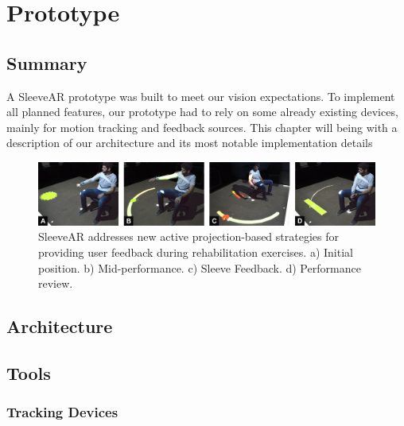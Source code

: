 \chapter{Prototype}
\label{sec:implementation}

\section*{Summary}
A SleeveAR prototype was built to meet our vision expectations. To implement all planned features, our prototype had to rely on some already existing devices, mainly for motion tracking and feedback sources. This chapter will being with a description of our architecture and its most notable implementation details




\begin{figure}[!t]
    \begin{center}
        \includegraphics[width=\textwidth]{imgs/impl/teaser.jpg}
    \end{center}
    \caption{SleeveAR addresses new active projection-based strategies for providing user feedback during rehabilitation exercises. a) Initial position. b) Mid-performance. c) Sleeve Feedback. d) Performance review.}
    \label{fig:teaser}
\end{figure}

\section{Architecture}
\label{sec:impl:arch}



\section{Tools}
\label{sec:impl:tools}

\subsection{Tracking Devices}


